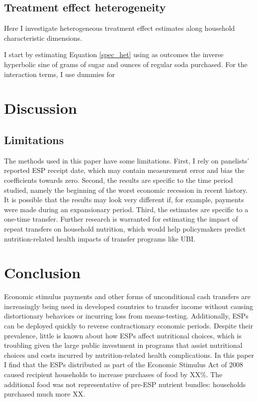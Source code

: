 \documentclass[12pt]{article}
\begin{document}
\subsection{Treatment effect heterogeneity}

Here I investigate heterogeneous treatment effect estimates along household characteristic dimensions.

I start by estimating Equation \ref{spec_het} using as outcomes the inverse hyperbolic sine of grams of sugar and ounces of regular soda purchased.
For the interaction terms, I use dummies for

\section{Discussion} \label{discussion}



\subsection{Limitations}

The methods used in this paper have some limitations.
First, I rely on panelists' reported ESP receipt date, which may contain measurement error and bias the coefficients towards zero.
Second, the results are specific to the time period studied, namely the beginning of the worst economic recession in recent history.
It is possible that the results may look very different if, for example, payments were made during an expansionary period.
Third, the estimates are specific to a one-time transfer.
Further research is warranted for estimating the impact of repeat transfers on household nutrition, which would help policymakers predict nutrition-related health impacts of transfer programs like UBI.


\section{Conclusion} \label{conclusion}

Economic stimulus payments and other forms of unconditional cash transfers are increasingly being used in developed countries to transfer income without causing distortionary behaviors or incurring loss from means-testing.
Additionally, ESPs can be deployed quickly to reverse contractionary economic periods.
Despite their prevalence, little is known about how ESPs affect nutritional choices, which is troubling given the large public investment in programs that assist nutritional choices and costs incurred by nutrition-related health complications.
In this paper I find that the ESPs distributed as part of the Economic Stimulus Act of 2008 caused recipient households to increase purchases of food by XX\%.
The additional food was not representative of pre-ESP nutrient bundles: households purchased much more XX.
\end{document}
